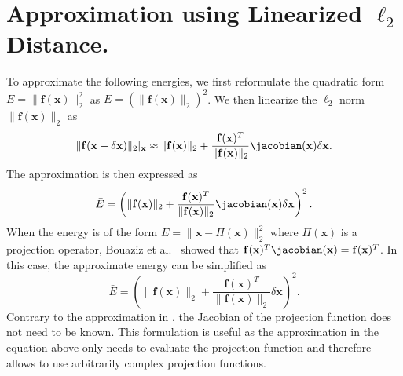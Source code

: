 \section{Approximation using Linearized $\ell_2$ Distance.}
\label{app:lindistance}
To approximate the following energies, we first reformulate the quadratic form $E = \|\mathbf{f}(\mathbf{x})\|_2^2$ as $E = (\|\mathbf{f}(\mathbf{x})\|_2)^2$. We then linearize the $\ell_2$ norm $\|\mathbf{f}(\mathbf{x})\|_2$ as
\begin{equation*}
\|\mathbf{f}(\mathbf{x}+\delta\mathbf{x})\|_2|_{\mathbf{x}} \approx \|\mathbf{f}(\mathbf{x})\|_2 + \frac{\mathbf{f}(\mathbf{x})^T}{\|\mathbf{f}(\mathbf{x})\|_2}\jacobian(\mathbf{x})\delta\mathbf{x}.
\end{equation*}
The approximation is then expressed as 
\begin{equation*}
\bar{E} = \left( \|\mathbf{f}(\mathbf{x})\|_2 + \frac{\mathbf{f}(\mathbf{x})^T}{\|\mathbf{f}(\mathbf{x})\|_2}\jacobian(\mathbf{x})\delta\mathbf{x} \right)^2.
\end{equation*}
When the energy is of the form $E = \|\mathbf{x} - \Pi(\mathbf{x})\|_2^2$ where $\Pi(\mathbf{x})$ is a projection operator, Bouaziz et al.~ showed that $\mathbf{f}(\mathbf{x})^T\jacobian(\mathbf{x}) = \mathbf{f}(\mathbf{x})^T$. In this case, the approximate energy can be simplified as 
\begin{equation*}
\label{eq:linproj}
\bar{E} = \left( \|\mathbf{f}(\mathbf{x})\|_2 + \frac{\mathbf{f}(\mathbf{x})^T}{\|\mathbf{f}(\mathbf{x})\|_2}\delta\mathbf{x} \right)^2.
\end{equation*}
Contrary to the approximation in , the Jacobian of the projection function does not need to be known. This formulation is useful as the approximation in the equation above 
only needs to evaluate the projection function and therefore allows to use arbitrarily complex projection functions.
% 
